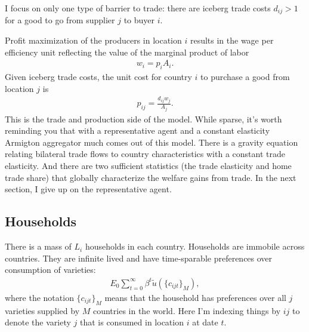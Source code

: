 \documentclass[12pt,pdftex]{article}
\begin{document}
\begin{onehalfspacing}
I focus on only one type of barrier to trade: there are iceberg trade costs $d_{ij} > 1$ for a good to go from supplier $j$ to buyer $i$.

Profit maximization of the producers in location $i$ results in the wage per efficiency unit reflecting the value of the marginal product of labor
\begin{align}
w_{i} = p_{i} A_{i}.
\label{eq:marginal-product}
\end{align}
Given iceberg trade costs, the unit cost for country $i$ to purchase a good from location $j$ is
\begin{align}
p_{ij} = \frac{d_{ij}w_{j}}{A_{j}}.
\label{eq:marginal-product-ship}
\end{align}
This is the trade and production side of the model. While sparse, it's worth reminding you that with a representative agent and a constant elasticity Armigton aggregator much comes out of this model. There is a gravity equation relating bilateral trade flows to country characteristics with a constant trade elasticity. And there are two sufficient statistics (the trade elasticity and home trade share) that globally characterize the welfare gains from trade. In the next section, I give up on the representative agent.

\subsection{Households}

There is a mass of $L_i$ households in each country. Households are immobile across countries. They are infinite lived and have time-sparable preferences over consumption of varieties:
\begin{align}
E_{0} \sum_{t = 0}^{\infty} \beta^{t} \tilde{u}( \{ c_{ijt} \}_{M}),
\end{align}
where the notation $\{ c_{ijt} \}_{M}$ means that the household has preferences over all $j$ varieties supplied by $M$ countries in the world. Here I'm indexing things by $ij$ to denote the variety $j$ that is consumed in location $i$ at date $t$.


\end{onehalfspacing}
\end{document}
